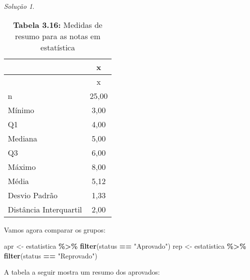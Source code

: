\documentclass[
]{latex/krantz}
\newenvironment{Shaded}{\begin{snugshade}}{\end{snugshade}}
\newcommand{\AttributeTok}[1]{\textcolor[rgb]{0.13,0.29,0.53}{#1}}
\newcommand{\ConstantTok}[1]{\textcolor[rgb]{0.56,0.35,0.01}{#1}}
\newcommand{\DecValTok}[1]{\textcolor[rgb]{0.00,0.00,0.81}{#1}}
\newcommand{\FunctionTok}[1]{\textcolor[rgb]{0.13,0.29,0.53}{\textbf{#1}}}
\newcommand{\NormalTok}[1]{#1}
\newcommand{\OtherTok}[1]{\textcolor[rgb]{0.56,0.35,0.01}{#1}}
\newcommand{\SpecialCharTok}[1]{\textcolor[rgb]{0.81,0.36,0.00}{\textbf{#1}}}
\newcommand{\StringTok}[1]{\textcolor[rgb]{0.31,0.60,0.02}{#1}}
\theoremstyle{definition}
\theoremstyle{definition}
\theoremstyle{definition}
\theoremstyle{definition}
\theoremstyle{remark}
\newtheorem*{solution}{Solução}
\begin{document}
\begin{solution}
\begin{longtable}[]{@{}lc@{}}
\caption{\textbf{Tabela 3.16:} Medidas de resumo para as notas em estatística}\tabularnewline
\toprule\noalign{}
& x \\
\midrule\noalign{}
\endfirsthead
\toprule\noalign{}
& x \\
\midrule\noalign{}
\endhead
\bottomrule\noalign{}
\endlastfoot
n & 25,00 \\
Mínimo & 3,00 \\
Q1 & 4,00 \\
Mediana & 5,00 \\
Q3 & 6,00 \\
Máximo & 8,00 \\
Média & 5,12 \\
Desvio Padrão & 1,33 \\
Distância Interquartil & 2,00 \\
\end{longtable}

Vamos agora comparar os grupos:

\begin{Shaded}
\begin{Highlighting}[]
\NormalTok{apr }\OtherTok{\textless{}{-}}\NormalTok{ estatistica }\SpecialCharTok{\%\textgreater{}\%} \FunctionTok{filter}\NormalTok{(status }\SpecialCharTok{==} \StringTok{"Aprovado"}\NormalTok{)}
\NormalTok{rep }\OtherTok{\textless{}{-}}\NormalTok{ estatistica }\SpecialCharTok{\%\textgreater{}\%} \FunctionTok{filter}\NormalTok{(status }\SpecialCharTok{==} \StringTok{"Reprovado"}\NormalTok{)}
\end{Highlighting}
\end{Shaded}

A tabela a seguir mostra um resumo dos aprovados:

\begin{Shaded}
\end{Shaded}


\end{solution}
\end{document}
